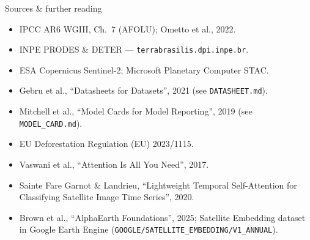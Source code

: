 \documentclass[aspectratio=169,11pt]{beamer}
\begin{document}
\appendix
\begin{frame}[allowframebreaks]{Sources \& further reading}
  \footnotesize
  \begin{itemize}
    \item IPCC AR6 WGIII, Ch.~7 (AFOLU); Ometto et al., 2022.
    \item INPE PRODES \& DETER — \texttt{terrabrasilis.dpi.inpe.br}.
    \item ESA Copernicus Sentinel-2; Microsoft Planetary Computer STAC.
    \item Gebru et al., ``Datasheets for Datasets'', 2021 (see \texttt{DATASHEET.md}).
    \item Mitchell et al., ``Model Cards for Model Reporting'', 2019
          (see \texttt{MODEL\_CARD.md}).
    \item EU Deforestation Regulation (EU) 2023/1115.
    \item Vaswani et al., ``Attention Is All You Need'', 2017.
    \item Sainte Fare Garnot \& Landrieu, ``Lightweight Temporal Self-Attention
          for Classifying Satellite Image Time Series'', 2020.
    \item Brown et al., ``AlphaEarth Foundations'', 2025; Satellite Embedding
          dataset in Google Earth Engine
          (\texttt{GOOGLE/SATELLITE\_EMBEDDING/V1\_ANNUAL}).
  \end{itemize}
\end{frame}
\end{document}

